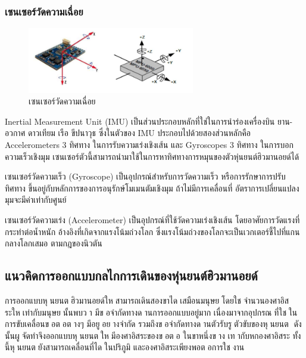 \subsubsection{เซนเซอร์วัดความเฉื่อย}

\begin{figure}[H]
    \centering
    \includegraphics[width=0.65\textwidth]{chapter2/images/imu.png}
    \caption{เซนเซอร์วัดความเฉื่อย}
    \label{fig:imu_sensor}
\end{figure}

Inertial Measurement Unit (IMU) เป็นส่วนประกอบหลักที่ใช่ในการนำร่องเครื่องบิน ยาน-อวกาศ ดาวเทียม เรือ
ขีปนาวุธ ซึ่งในตัวของ IMU ประกอบไปด้วยสองส่วนหลักคือ Accelerometers 3 ทิศทาง ในการรับความเร่งเชิงเส้น
และ Gyroscopes 3 ทิศทาง ในการบอกความเร็วเชิงมุม เซนเซอร์ตัวนี้สามารถนำมาใช้ในการหาทิศทางการหมุนของตัวหุ่นยนต์ฮิวมานอยด์ได้

เซนเซอร์วัดความเร็ว (Gyroscope) เป็นอุปกรณ์สำหรับการวัดความเร็ว หรือการรักษาการปรับทิศทาง ขึ้นอยู่กับหลักการของการอนุรักษ์โมเมนตัมเชิงมุม
ถ้าไม่มีการเคลื่อนที่ อัตราการเปลี่ยนแปลงมุมจะมีค่าเท่ากับศูนย์

เซนเซอร์วัดความเร่ง (Accelerometer) เป็นอุปกรณ์ที่ใช้วัดความเร่งเชิงเส้น โดยอาศัยการวัดแรงที่กระทำต่อน้ำหนัก
อ้างอิงที่เกิดจากแรงโน้มถ่วงโลก ซึ่งแรงโน้มถ่วงของโลกจะเป็นเวกเตอร์ชี้ไปที่แกนกลางโลกเสมอ ตามกฎของนิวตัน

\subsection{แนวคิดการออกแบบกลไกการเดินของหุ่นยนต์ฮิวมานอยด์}
การออกแบบหุนยนตฮิวมานอยด์ใหสามารถเดินสองขาไดเสมือนมนุษยโดยใชจํานวนองศาอิสระใหเท่ากับมนุษยนั้นพบวา
มีขอจํากัดทางดานการออกแบบอยู่มาก เนื่องมาจากอุปกรณที่ใชในการขับเคลื่อนขอตอตางๆ มีอยูอยางจํากัด
รวมถึงขอจํากัดทางดานตัวรับรูตัวขับของหุนยนต ดังนั้นผูจัดทําจึงออกแบบหุนยนตใหมีองศาอิสระของขอตอ ในขาหนึ่งขาง
เทากับหกองศาอิสระ ทั้งนี้หุนยนตยังสามารถเคลื่อนที่ไดในปริภูมิ และองศาอิสระเพียงพอตอการใชงาน